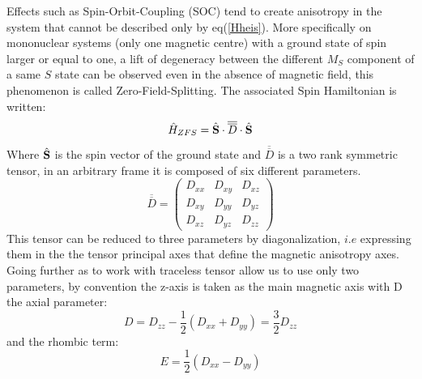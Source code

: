 \documentclass[10pt]{report}
\numberwithin{equation}{section}
\begin{document}
\par Effects such as Spin-Orbit-Coupling (SOC) tend to create anisotropy in the system that cannot be described only by eq(\ref{Hheis}). 
More specifically on mononuclear systems (only one magnetic centre) with a ground state of spin larger or equal to one, a lift of degeneracy between the different $M_S$ component of a same $S$ state can be observed even in the absence of magnetic field, this phenomenon is called Zero-Field-Splitting.
The associated Spin Hamiltonian is written:
\begin{equation}\label{SDS}
    \hat{H}_{ZFS}=\hat{\vb S} \cdot \overline{\overline{D}} \cdot \hat{\vb S}
\end{equation}
Where $\hat{\vb S}$ is the spin vector of the ground state and $\overline{\overline{D}}$ is a two rank symmetric tensor, in an arbitrary frame it is composed of six different parameters.
\begin{equation}
    \overline{\overline{D}}=\begin{pmatrix}
        D_{xx} & D_{xy} & D_{xz}\\
        D_{xy} & D_{yy} & D_{yz}\\
        D_{xz} & D_{yz} & D_{zz}
    \end{pmatrix}
\end{equation}
This tensor can be reduced to three parameters by diagonalization, $\textit{i.e}$ expressing them in the the tensor principal axes that define the magnetic anisotropy axes.
Going further as to work with traceless tensor allow us to use only two parameters, by convention the z-axis is taken as the main magnetic axis with D the axial parameter:
\begin{equation}\label{ParametreD}
    D=D_{zz}-\frac{1}{2}(D_{xx}+D_{yy})=\frac{3}{2}D_{zz}
\end{equation}
and the rhombic term:
\begin{equation}\label{ParametreE}
    E=\frac{1}{2}(D_{xx}-D_{yy})
\end{equation}
\end{document}
